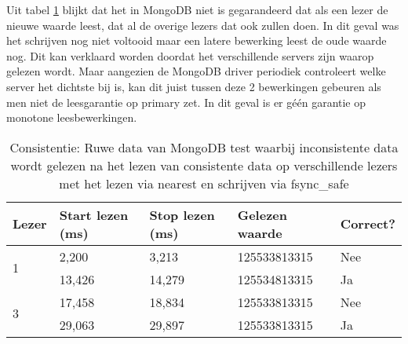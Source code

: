 Uit tabel \ref{table:consistentie-mongodb-inconsistency} blijkt dat het in MongoDB niet is gegarandeerd dat als een lezer de nieuwe waarde leest, dat al de overige lezers dat ook zullen doen. In dit geval was het schrijven nog niet voltooid maar een latere bewerking leest de oude waarde nog. Dit kan verklaard worden doordat het verschillende servers zijn waarop gelezen wordt. Maar aangezien de MongoDB driver periodiek controleert welke server het dichtste bij is, kan dit juist tussen deze 2 bewerkingen gebeuren als men niet de leesgarantie op primary zet. In dit geval is er géén garantie op monotone leesbewerkingen. 

\begin{table}
\centering
\begin{tabular}{l | l l l l}
Lezer & Start lezen (ms) & Stop lezen (ms) & Gelezen waarde & Correct? \\
\hline
\multirow{2}{*}{1} & 2,200 & 3,213 & 125533813315 & Nee\\
 & 13,426 & 14,279 & 125534813315 & Ja \\
 \multirow{2}{*}{3} & 17,458 & 18,834 & 125533813315 & Nee\\
 & 29,063 & 29,897 & 125533813315& Ja \\
\end{tabular}
\caption{Consistentie: Ruwe data van MongoDB test waarbij inconsistente data wordt gelezen na het lezen van consistente data op verschillende lezers met het lezen via nearest en schrijven via fsync\_safe}
\label{table:consistentie-mongodb-inconsistency}
\end{table}

